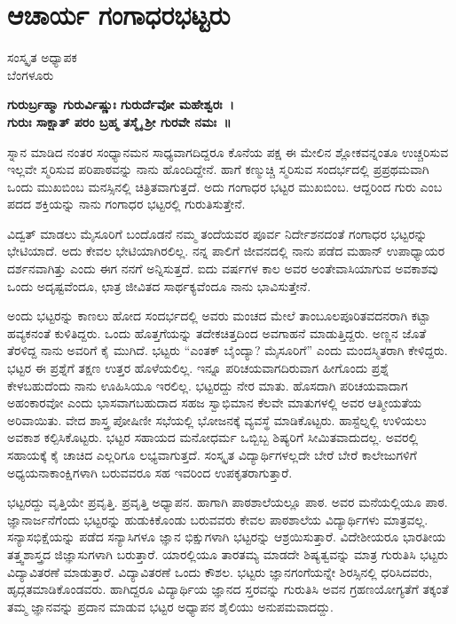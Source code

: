 {\fontsize{14}{16}\selectfont
\chapter{ಆಚಾರ್ಯ ಗಂಗಾಧರಭಟ್ಟರು}

\begin{center}
\smallskip
ಸಂಸ್ಕೃತ ಅಧ್ಯಾಪಕ\\
ಬೆಂಗಳೂರು
\addrule
\end{center}
\begin{center}
\textbf{ಗುರುರ್ಬ್ರಹ್ಮಾ ಗುರುರ್ವಿಷ್ಣುಃ ಗುರುರ್ದೆವೋ ಮಹೇಶ್ವರಃ~।\\
ಗುರುಃ ಸಾಕ್ಷಾತ್ ಪರಂ ಬ್ರಹ್ಮ ತಸ್ಮೈ ಶ್ರೀ ಗುರವೇ ನಮಃ~॥}
\end{center}
ಸ್ನಾನ ಮಾಡಿದ ನಂತರ ಸಂಧ್ಯಾನಮನ ಸಾಧ್ಯವಾಗದಿದ್ದರೂ ಕೊನೆಯ ಪಕ್ಷ ಈ ಮೇಲಿನ ಶ್ಲೋಕವನ್ನಂತೂ ಉಚ್ಚರಿಸುವ ಇಲ್ಲವೇ ಸ್ಮರಿಸುವ ಪರಿಪಾಠವನ್ನು ನಾನು ಹೊಂದಿದ್ದೇನೆ. ಹಾಗೆ ಕಣ್ಮುಚ್ಚಿ ಸ್ಮರಿಸುವ ಸಂದರ್ಭದಲ್ಲಿ ಪ್ರಪ್ರಥಮವಾಗಿ ಒಂದು ಮುಖಬಿಂಬ ಮನಸ್ಸಿನಲ್ಲಿ ಚಿತ್ರಿತವಾಗುತ್ತದೆ. ಅದು ಗಂಗಾಧರ ಭಟ್ಟರ ಮುಖಬಿಂಬ. ಆದ್ದರಿಂದ ಗುರು ಎಂಬ ಪದದ ಶಕ್ತಿಯನ್ನು ನಾನು ಗಂಗಾಧರ ಭಟ್ಟರಲ್ಲಿ ಗುರುತಿಸುತ್ತೇನೆ.

ವಿದ್ವತ್ ಮಾಡಲು ಮೈಸೂರಿಗೆ ಬಂದೊಡನೆ ನಮ್ಮ ತಂದೆಯವರ ಪೂರ್ವ ನಿರ್ದೇಶನದಂತೆ ಗಂಗಾಧರ ಭಟ್ಟರನ್ನು ಭೇಟಿಯಾದೆ. ಅದು ಕೇವಲ ಭೇಟಿಯಾಗಿರಲಿಲ್ಲ. ನನ್ನ ಪಾಲಿಗೆ ಜೀವನದಲ್ಲಿ ನಾನು ಪಡೆದ ಮಹಾನ್ ಉಪಾಧ್ಯಾಯರ ದರ್ಶನವಾಗಿತ್ತು ಎಂದು ಈಗ ನನಗೆ ಅನ್ನಿಸುತ್ತದೆ. ಐದು ವರ್ಷಗಳ ಕಾಲ ಅವರ ಅಂತೇವಾಸಿಯಾಗುವ ಅವಕಾಶವು ಒಂದು ಅದೃಷ್ಟವೆಂದೂ, ಛಾತ್ರ ಜೀವಿತದ ಸಾರ್ಥಕ್ಯವೆಂದೂ ನಾನು ಭಾವಿಸುತ್ತೇನೆ.

ಅಂದು ಭಟ್ಟರನ್ನು ಕಾಣಲು ಹೋದ ಸಂದರ್ಭದಲ್ಲಿ ಅವರು ಮಂಚದ ಮೇಲೆ ತಾಂಬೂಲಪೂರಿತವದನರಾಗಿ ಕಟ್ಟಾ ಹವ್ಯಕನಂತೆ ಕುಳಿತಿದ್ದರು. ಒಂದು ಹೊತ್ತಗೆಯನ್ನು ತದೇಕಚಿತ್ತದಿಂದ ಅವಗಾಹನೆ ಮಾಡುತ್ತಿದ್ದರು. ಅಣ್ಣನ ಜೊತೆ ತೆರಳಿದ್ದ ನಾನು ಅವರಿಗೆ ಕೈ ಮುಗಿದೆ. ಭಟ್ಟರು “ಎಂತಕ್ ಬೈಂದ್ಯಾ? ಮೈಸೂರಿಗೆ” ಎಂದು ಮಂದಸ್ಮಿತರಾಗಿ ಕೇಳಿದ್ದರು. ಭಟ್ಟರ ಈ ಪ್ರಶ್ನೆಗೆ ತಕ್ಷಣ ಉತ್ತರ ಹೊಳೆಯಲಿಲ್ಲ. ಇನ್ನೂ ಪರಿಚಯವಾಗದಿರುವಾಗ ಹೀಗೊಂದು ಪ್ರಶ್ನೆ ಕೇಳಬಹುದೆಂದು ನಾನು ಊಹಿಸಿಯೂ ಇರಲಿಲ್ಲ. ಭಟ್ಟರದ್ದು ನೇರ ಮಾತು. ಹೊಸದಾಗಿ ಪರಿಚಯವಾದಾಗ ಅಹಂಕಾರವೋ ಎಂದು ಭಾಸವಾಗಬಹುದಾದ ಸಹಜ ಸ್ವಾಭಿಮಾನ ಕೆಲವೇ ಮಾತುಗಳಲ್ಲಿ ಅವರ ಆತ್ಮೀಯತೆಯ ಅರಿವಾಯಿತು. ವೇದ ಶಾಸ್ತ್ರ ಪೋಷಿಣೀ ಸಭೆಯಲ್ಲಿ ಭೋಜನಕ್ಕೆ ವ್ಯವಸ್ಥೆ ಮಾಡಿಕೊಟ್ಟರು. ಹಾಸ್ಟೆಲ್ನಲ್ಲಿ ಉಳಿಯಲು ಅವಕಾಶ ಕಲ್ಪಿಸಿಕೊಟ್ಟರು. ಭಟ್ಟರ ಸಹಾಯದ ಮನೋಧರ್ಮ ಒಬ್ಬಿಬ್ಬ ಶಿಷ್ಯರಿಗೆ ಸೀಮಿತವಾದುದಲ್ಲ. ಅವರಲ್ಲಿ ಸಹಾಯಕ್ಕೆ ಕೈ ಚಾಚಿದ ಎಲ್ಲರಿಗೂ ಲಭ್ಯವಾಗುತ್ತದೆ. ಸಂಸ್ಕೃತ ವಿದ್ಯಾರ್ಥಿಗಳಲ್ಲದೇ ಬೇರೆ ಬೇರೆ ಕಾಲೇಜುಗಳಿಗೆ ಅಧ್ಯಯನಾಕಾಂಕ್ಷಿಗಳಾಗಿ ಬರುವವರೂ ಸಹ ಇವರಿಂದ ಉಪಕೃತರಾಗುತ್ತಾರೆ.

ಭಟ್ಟರದ್ದು ವೃತ್ತಿಯೇ ಪ್ರವೃತ್ತಿ. ಪ್ರವೃತ್ತಿ ಅಧ್ಯಾಪನ. ಹಾಗಾಗಿ ಪಾಠಶಾಲೆಯಲ್ಲೂ ಪಾಠ. ಅವರ ಮನೆಯಲ್ಲಿಯೂ ಪಾಠ. ಜ್ಞಾನಾರ್ಜನೆಗೆಂದು ಭಟ್ಟರನ್ನು ಹುಡುಕಿಕೊಂಡು ಬರುವವರು ಕೇವಲ ಪಾಠಶಾಲೆಯ ವಿದ್ಯಾರ್ಥಿಗಳು ಮಾತ್ರವಲ್ಲ. ಸನ್ಯಾಸಭಿಕ್ಷೆಯನ್ನು ಪಡೆದ ಸನ್ಯಾಸಿಗಳೂ ಜ್ಞಾನ ಭಿಕ್ಷುಗಳಾಗಿ ಭಟ್ಟರನ್ನು ಆಶ್ರಯಿಸುತ್ತಾರೆ. ವಿದೇಶೀಯರೂ ಭಾರತೀಯ ತತ್ತ್ವಶಾಸ್ತ್ರದ ಜಿಜ್ಞಾಸುಗಳಾಗಿ ಬರುತ್ತಾರೆ. ಯಾರಲ್ಲಿಯೂ ತಾರತಮ್ಯ ಮಾಡದೇ ಶಿಷ್ಯತ್ವವನ್ನು ಮಾತ್ರ ಗುರುತಿಸಿ ಭಟ್ಟರು ವಿದ್ಯಾವಿತರಣೆ ಮಾಡುತ್ತಾರೆ. ವಿದ್ಯಾವಿತರಣೆ ಒಂದು ಕೌಶಲ. ಭಟ್ಟರು ಜ್ಞಾನಗಂಗೆಯನ್ನೇ ಶಿರಸ್ಸಿನಲ್ಲಿ ಧರಿಸಿದವರು, ಹೃದ್ಗತಮಾಡಿಕೊಂಡವರು. ಹಾಗಿದ್ದರೂ ವಿದ್ಯಾರ್ಥಿಯ ಜ್ಞಾನದ ಸ್ತರವನ್ನು ಗುರುತಿಸಿ ಅವನ ಗ್ರಹಣಯೋಗ್ಯತೆಗೆ ತಕ್ಕಂತೆ ತಮ್ಮ ಜ್ಞಾನವನ್ನು ಪ್ರದಾನ ಮಾಡುವ ಭಟ್ಟರ ಅಧ್ಯಾಪನ ಶೈಲಿಯು ಅನುಪಮವಾದದ್ದು.

}
